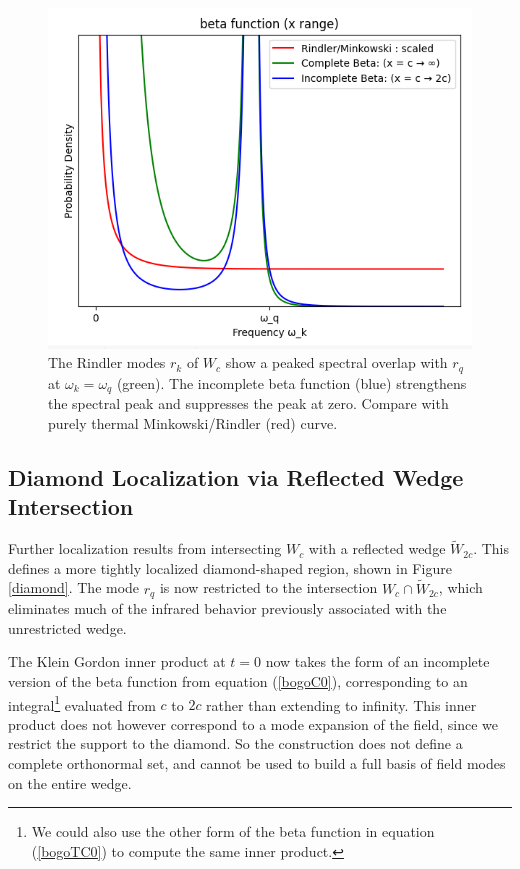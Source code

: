 \documentclass[12pt,a4paper]{article}
\begin{document}
{\begin{figure}[h]
  \centering
\includegraphics[scale=0.6]{peaked.png}
\caption{The Rindler modes $r_k$ of $W_c$ show a peaked spectral overlap with $r_q$ at $\omega_k = \omega_q$ (green). The incomplete beta function (blue) strengthens the spectral peak and suppresses the peak at zero. Compare with purely thermal Minkowski/Rindler (red) curve.}
\label{peaked}
\end{figure}

\subsection{Diamond Localization via Reflected Wedge Intersection}

Further localization results from intersecting $W_c$ with a reflected wedge $\widetilde{W}_{2c}$. This defines a more tightly localized diamond-shaped region, shown in Figure \ref{diamond}. The mode $r_q$ is now restricted to the intersection $W_c \cap \widetilde{W}_{2c}$, which eliminates much of the infrared behavior previously associated with the unrestricted wedge.

The Klein Gordon inner product at $t=0$ now takes the form of an incomplete version of the beta function from equation (\ref{bogoC0}), corresponding to an integral\footnote{We could also use the other form of the beta function in equation (\ref{bogoTC0}) to compute the same inner product.} evaluated from $c$ to $2c$ rather than extending to infinity. This inner product does not however correspond to a mode expansion of the field, since we restrict the support to the diamond. So the construction does not define a complete orthonormal set, and cannot be used to build a full basis of field modes on the entire wedge.

}
\end{document}
